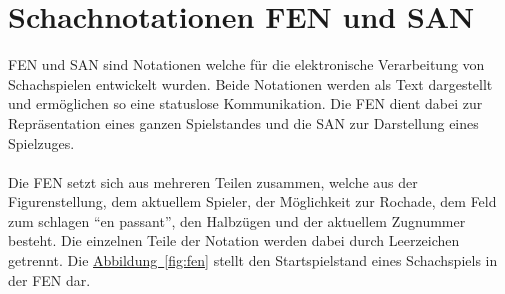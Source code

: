 \section{Schachnotationen FEN und SAN}\label{sec:chessNotation}
\gls{FEN} und \gls{SAN} sind Notationen welche für die elektronische Verarbeitung von Schachspielen entwickelt wurden. Beide Notationen werden als Text dargestellt und ermöglichen so eine statuslose Kommunikation. Die \gls{FEN} dient dabei zur Repräsentation eines ganzen Spielstandes und die \gls{SAN} zur Darstellung eines Spielzuges.\\
\\
Die \gls{FEN} setzt sich aus mehreren Teilen zusammen, welche aus der Figurenstellung, dem aktuellem Spieler, der Möglichkeit zur Rochade, dem Feld zum schlagen \enquote{en passant}, den Halbzügen und der aktuellem Zugnummer besteht. Die einzelnen Teile der Notation werden dabei durch Leerzeichen getrennt. Die \hyperref[fig:fen]{Abbildung~\ref{fig:fen}} stellt den Startspielstand eines Schachspiels in der \gls{FEN} dar.\\

